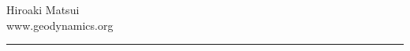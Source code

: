 {%
\null
\vfill
\color{dark_grey}
\Large \hfill {\raggedleft \fontfamily{\sfdefault}\selectfont
Hiroaki Matsui \\
}
{\fontfamily{\sfdefault}\selectfont www.geodynamics.org}


\color{dark_grey}
\rule{\textwidth}{2pt}

}

\pagebreak
\restoregeometry
{}

